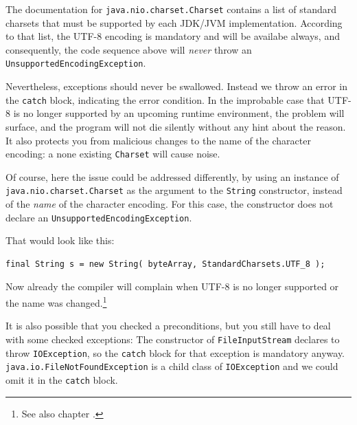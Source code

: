 The documentation for \lstinline|java.nio.charset.Charset| contains a list of standard charsets \autocite{ORACLE_DOC_CHARSET:StandardCharsets} that must be supported by each JDK/JVM implementation. According to that list, the UTF-8 \autocite{WIKIPEDIA:UTF8} encoding is mandatory and will be availabe always, and consequently, the code sequence above will \textit{never} throw an \lstinline|UnsupportedEncodingException|. 

Nevertheless, exceptions should never be swallowed. Instead we throw an error in the \lstinline|catch| block, indicating the error condition. In the improbable case that UTF-8 is no longer supported by an upcoming \Java runtime environment, the problem will surface, and the program will not die silently without any hint about the reason. It also protects you from malicious changes to the name of the character encoding: a none existing \lstinline|Charset| will cause noise.

Of course, here the issue could be addressed differently, by using an instance of \lstinline|java.nio.charset.Charset| \autocite{ORACLE_DOC_CHARSET_CLASS} as the argument to the \lstinline|String| constructor, instead of the \textit{name} of the character encoding. For this case, the constructor does not declare an \lstinline|UnsupportedEncodingException|.
 
That would look like this:
\begin{lstlisting}
final String s = new String( byteArray, StandardCharsets.UTF_8 );
\end{lstlisting}

Now already the compiler will complain when UTF-8 is no longer supported or the name was changed.\footnote{See also chapter .}

It is also possible that you checked a preconditions, but you still have to deal with some checked exceptions: The constructor of \lstinline|FileInputStream| declares to throw \lstinline|IOException|, so the \lstinline|catch| block for that exception is mandatory anyway. \lstinline|java.io.FileNotFoundException| is a child class of \lstinline|IOException| and we could omit it in the \lstinline|catch| block.

